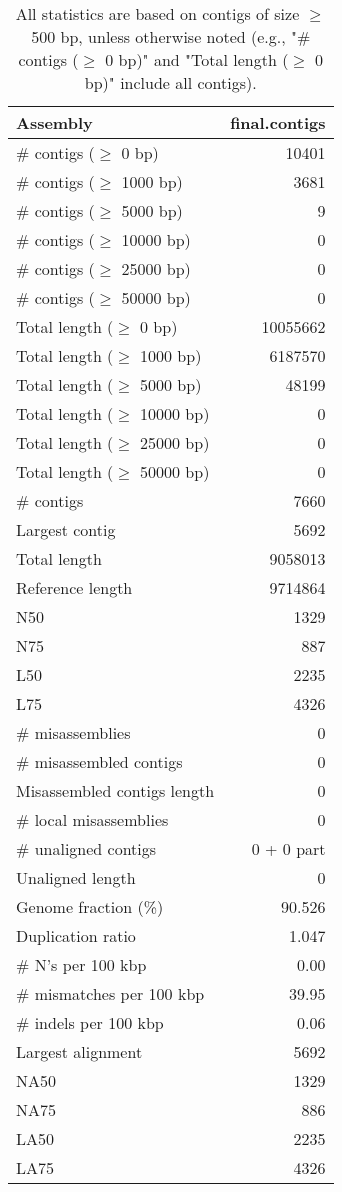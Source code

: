 \documentclass[12pt,a4paper]{article}
\begin{document}
\begin{table}[ht]
\begin{center}
\caption{All statistics are based on contigs of size $\geq$ 500 bp, unless otherwise noted (e.g., "\# contigs ($\geq$ 0 bp)" and "Total length ($\geq$ 0 bp)" include all contigs).}
\begin{tabular}{|l*{1}{|r}|}
\hline
Assembly & final.contigs \\ \hline
\# contigs ($\geq$ 0 bp) & 10401 \\ \hline
\# contigs ($\geq$ 1000 bp) & 3681 \\ \hline
\# contigs ($\geq$ 5000 bp) & 9 \\ \hline
\# contigs ($\geq$ 10000 bp) & 0 \\ \hline
\# contigs ($\geq$ 25000 bp) & 0 \\ \hline
\# contigs ($\geq$ 50000 bp) & 0 \\ \hline
Total length ($\geq$ 0 bp) & 10055662 \\ \hline
Total length ($\geq$ 1000 bp) & 6187570 \\ \hline
Total length ($\geq$ 5000 bp) & 48199 \\ \hline
Total length ($\geq$ 10000 bp) & 0 \\ \hline
Total length ($\geq$ 25000 bp) & 0 \\ \hline
Total length ($\geq$ 50000 bp) & 0 \\ \hline
\# contigs & 7660 \\ \hline
Largest contig & 5692 \\ \hline
Total length & 9058013 \\ \hline
Reference length & 9714864 \\ \hline
N50 & 1329 \\ \hline
N75 & 887 \\ \hline
L50 & 2235 \\ \hline
L75 & 4326 \\ \hline
\# misassemblies & 0 \\ \hline
\# misassembled contigs & 0 \\ \hline
Misassembled contigs length & 0 \\ \hline
\# local misassemblies & 0 \\ \hline
\# unaligned contigs & 0 + 0 part \\ \hline
Unaligned length & 0 \\ \hline
Genome fraction (\%) & 90.526 \\ \hline
Duplication ratio & 1.047 \\ \hline
\# N's per 100 kbp & 0.00 \\ \hline
\# mismatches per 100 kbp & 39.95 \\ \hline
\# indels per 100 kbp & 0.06 \\ \hline
Largest alignment & 5692 \\ \hline
NA50 & 1329 \\ \hline
NA75 & 886 \\ \hline
LA50 & 2235 \\ \hline
LA75 & 4326 \\ \hline
\end{tabular}
\end{center}
\end{table}
\end{document}
